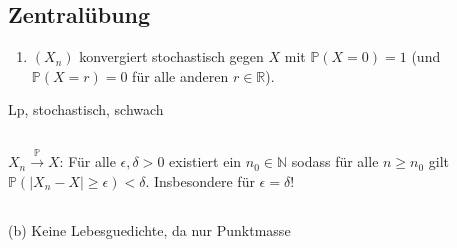\documentclass[a4paper]{article}
\begin{document}
\makeexheader

\subsection{Zentralübung}

\begin{enumerate}
    \item $(X_n)$ konvergiert stochastisch gegen $X$ mit $\mathds{P}(X = 0) = 1$ (und $\mathds{P}(X = r) = 0$ für alle anderen $r \in \mathds{R}$).
\end{enumerate}

Lp, stochastisch, schwach

\subsection{}

$X_n \xrightarrow{\mathds{P}} X$: Für alle $\epsilon, \delta > 0$ existiert ein $n_0 \in \mathds{N}$ sodass für alle $n \geq n_0$ gilt $\mathds{P}(|X_n - X| \geq \epsilon ) < \delta$. Insbesondere für $\epsilon = \delta$!

\subsection{}

\subsection{}

(b) Keine Lebesguedichte, da nur Punktmasse
\end{document}
